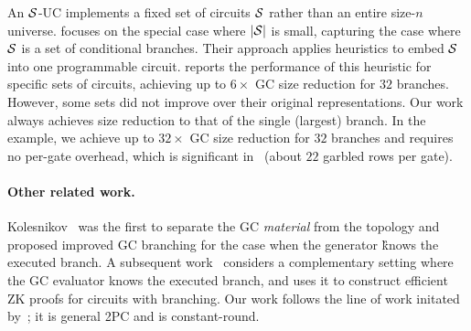 An $\cal S$-UC implements a fixed set of circuits $\cal S$ rather than an entire size-$n$ universe.
\cite{AC:KenKolWil17} focuses on the special case where $|\cal S|$ is small, capturing the case where $\cal S$ is a set of conditional branches.
Their approach applies heuristics to embed $\cal S$ into one programmable circuit.
\cite{AC:KenKolWil17} reports the performance of this heuristic for specific sets of circuits, achieving up to $6\times$ GC size reduction for $32$ branches.
However, some sets did not improve over their original representations.  Our work always achieves size reduction to that of the single (largest) branch. In the~\cite{AC:KenKolWil17} example, we achieve up to $32\times$ GC size reduction for $32$ branches and requires no per-gate overhead, which is significant  in~\cite{AC:KenKolWil17} (about $22$ garbled rows per gate).  


\paragraph{Other related work.}


Kolesnikov~\cite{AC:Kolesnikov18} was the first to separate the GC {\em material} from the topology and proposed improved GC branching for the case when the generator \G knows the executed branch.  A subsequent work~\cite{EC:HeaKol20} considers a complementary setting where the GC evaluator \E knows the executed branch, and uses it to construct efficient ZK proofs for circuits with branching.
Our work follows the line of work initated by~\cite{AC:Kolesnikov18,EC:HeaKol20}; it is general 2PC and is constant-round.






